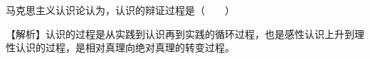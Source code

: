 \question 马克思主义认识论认为，认识的辩证过程是（　　）
\par{}
\begin{solution}【解析】认识的过程是从实践到认识再到实践的循环过程，也是感性认识上升到理性认识的过程，是相对真理向绝对真理的转变过程。
\end{solution}

